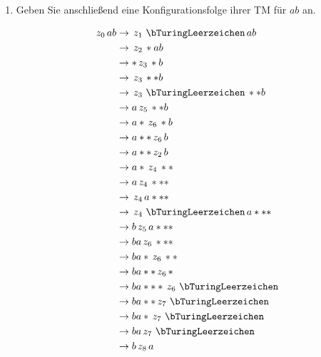 \documentclass{bschlangaul-aufgabe}
\begin{document}
\begin{enumerate}
\begin{bAntwort}
\begin{center}
\end{center}
\end{bAntwort}

\item Geben Sie anschließend eine Konfigurationsfolge ihrer TM für $ab$
an.

\begin{bAntwort}
\begin{align*}
\z0 a b \p \z1 \l  ab\\
\p \z2 * a b \\
\p * \z3 * b \\
\p \z3 * * b \\
\p \z3 \l * * b \\
\p a \z5 * * b \\
\p a * \z6 * b \\
\p a * * \z6 b \\
\p a * * \z2 b \\
\p a * \z4 * * \\
\p a \z4 * * * \\
\p \z4 a * * * \\
\p \z4 \l a * * * \\
\p b \z5 a * * * \\
\p b a \z6 * * * \\
\p b a * \z6 * * \\
\p b a * * \z6 * \\
\p b a * * * \z6 \l\\
\p b a * * \z7 \l\\
\p b a * \z7 \l\\
\p b a \z7 \l\\
\p b  \z8  a
\end{align*}

\end{bAntwort}
\end{enumerate}
\end{document}
